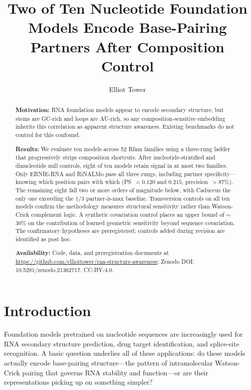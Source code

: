 \documentclass[11pt]{article}
\title{Two of Ten Nucleotide Foundation Models Encode Base-Pairing\\
Partners After Composition Control}
\author{Elliot Tower}
\affil{Independent researcher \\ \texttt{elliot@elliottower.ai}}
\date{}
\begin{document}
\maketitle

\begin{abstract}
\noindent\textbf{Motivation:}
RNA foundation models appear to encode secondary structure, but stems
are GC-rich and loops are AU-rich, so any composition-sensitive
embedding inherits this correlation as apparent structure awareness.
Existing benchmarks do not control for this confound.

\noindent\textbf{Results:}
We evaluate ten models across 52 Rfam families using a three-rung
ladder that progressively strips composition shortcuts. After
nucleotide-stratified and dinucleotide null controls, eight of ten
models retain signal in at most two families. Only ERNIE-RNA and
RiNALMo pass all three rungs, including partner specificity---knowing
which position pairs with which (PS~$= 0.120$ and $0.215$,
precision~$> 87\%$). The remaining eight fall two or more orders of
magnitude below, with Caduceus the only one exceeding the 1/3
partner-is-max baseline. Transversion controls on all ten models confirm
the methodology measures structural sensitivity rather than
Watson-Crick complement logic. A synthetic covariation control places
an upper bound of $\sim$30\% on the contribution of learned geometric
sensitivity beyond sequence covariation. The confirmatory hypotheses are
preregistered; controls added during revision are identified as post hoc.

\noindent\textbf{Availability:}
Code, data, and preregistration documents at
\url{https://github.com/elliottower/rna-structure-awareness}; Zenodo
DOI: 10.5281/zenodo.21362717. CC-BY-4.0.
\end{abstract}


\section{Introduction}

Foundation models pretrained on nucleotide sequences are increasingly
used for RNA secondary structure prediction, drug target
identification, and splice-site recognition. A basic question
underlies all of these applications: do these models actually
encode base-pairing structure---the pattern of intramolecular
Watson-Crick pairing that governs RNA stability and function---or
are their representations picking up on something simpler?
\end{document}
